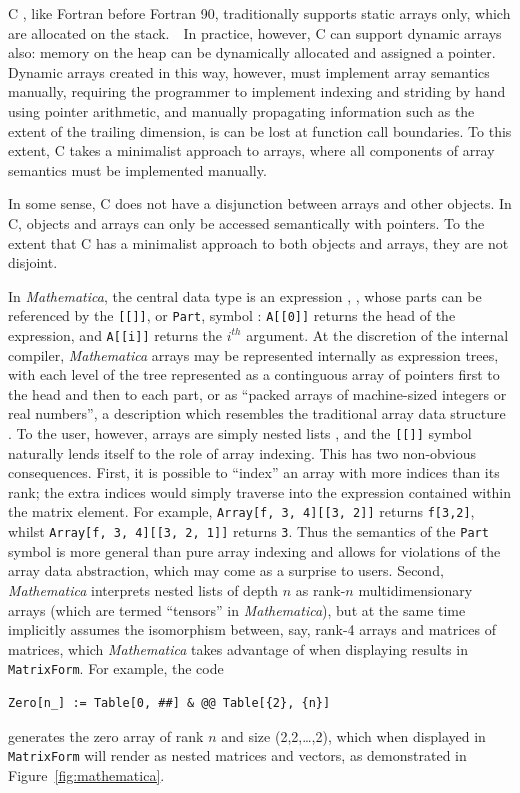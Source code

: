\documentclass[preprint]{sigplanconf}
\newcommand{\Mathematica}{\textit{Mathematica}}
\newcommand{\code}[1]{\texttt{#1}}
\begin{document}
C \cite{Kernigham:1978cp}, like Fortran before Fortran 90, traditionally supports static arrays only, which are allocated on the stack.　In practice, however, C can support dynamic arrays also: memory on the heap can be dynamically allocated and assigned a pointer. Dynamic arrays created in this way, however, must implement array semantics manually, requiring the programmer to implement indexing and striding by hand using pointer arithmetic, and manually propagating information such as the extent of the trailing dimension, is can be lost at function call boundaries. To this extent, C takes a minimalist approach to arrays, where all components of array semantics must be implemented manually.


In some sense, C does not have a disjunction between arrays and other objects. In C, objects and arrays can only be accessed semantically with pointers. To the extent that C has a minimalist approach to both objects and arrays, they are not disjoint.

In \Mathematica, the central data type is an expression \cite{mathematica:expr},
\url{}, whose parts can be referenced by the \code{[[]]}, or \code{Part}, symbol \cite{mathematica:part}: \code{A[[0]]} returns the head of the expression, and \code{A[[i]]} returns the $i^{th}$ argument. At the discretion of the internal compiler, \Mathematica{} arrays may be represented internally as expression trees, with each level of the tree represented as a continguous array of pointers first to the head and then to each part, or as ``packed arrays of machine-sized integers or real numbers'', a description which resembles the traditional array data structure \cite{mathematica:int}. To the user, however, arrays are simply nested lists \cite{mathematica:nl}, and the \code{[[]]} symbol naturally lends itself to the role of array indexing. This has two non-obvious consequences. First, it is possible to ``index'' an array with more indices than its rank; the extra indices would simply traverse into the expression contained within the matrix element. For example, \code{Array[f, {3, 4}][[3, 2]]} returns \code{f[3,2]}, whilst \code{Array[f, {3, 4}][[3, 2, 1]]} returns \code{3}. Thus the semantics of the \code{Part} symbol is more general than pure array indexing and allows for violations of the array data abstraction, which may come as a surprise to users. Second, \Mathematica{} interprets nested lists of depth $n$ as rank-$n$ multidimensionary arrays (which are termed ``tensors'' in \Mathematica), but at the same time implicitly assumes the isomorphism between, say, rank-4 arrays and matrices of matrices, which \Mathematica{} takes advantage of when displaying results in \code{MatrixForm}. For example, the code 
\begin{verbatim}
Zero[n_] := Table[0, ##] & @@ Table[{2}, {n}]
\end{verbatim}
generates the zero array of rank $n$ and size (2,2,\dots,2), which when displayed in \code{MatrixForm} will render as nested matrices and vectors, as demonstrated in Figure~\ref{fig:mathematica}.
\end{document}

